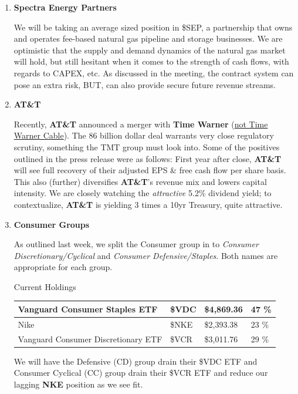 \documentclass[11pt,pressrelease]{newlfm} %
\begin{document}
\begin{newlfm}


\vspace{-.25 in} 			%
\begin{singlespace} 		%

\begin{enumerate}
\item \textbf{Spectra Energy Partners} \par
We will be taking an average sized position in \$SEP, a partnership that owns and operates fee-based natural gas pipeline and storage businesses. We are optimistic that the supply and demand dynamics of the natural gas market will hold, but still hesitant when it comes to the strength of cash flows, with regards to CAPEX, etc. As discussed in the meeting, the contract system can pose an extra risk, BUT, can also provide secure future revenue streams.

\item \textbf{AT\&T} \par
Recently, \textbf{AT\&T} announced a merger with \textbf{Time Warner} (\href{http://www.wsj.com/articles/time-warner-makes-game-of-thrones-confused-customers-think-its-the-cable-company-1464790213}{not Time Warner Cable}). The 86 billion dollar deal warrants very close regulatory scrutiny, something the TMT group must look into. Some of the positives outlined in the press release were as follows: First year after close, \textbf{AT\&T} will see full recovery of their adjusted EPS \& free cash flow per share basis. This also (further) diversifies \textbf{AT\&T}’s revenue mix and lowers capital intensity. We are closely watching the \textit{attractive} 5.2\% dividend yield; to contextualize, \textbf{AT\&T} is yielding 3 times a 10yr Treasury, quite attractive. 

\item \textbf{Consumer Groups} \par
As outlined last week, we split the Consumer group in to \textit{Consumer Discretionary/Cyclical} and \textit{Consumer Defensive/Staples}. Both names are appropriate for each group. 

\begin{center}
Current Holdings \\
\begin{tabular}{|l|l|l|l|}
\hline
Vanguard Consumer Staples ETF &	\$VDC &	\$4,869.36 & 47 \%\\
\hline \hline
Nike &	\$NKE  & \$2,393.38 & 23 \% \\
\hline
Vanguard Consumer Discretionary ETF  & \$VCR & \$3,011.76 & 29 \% \\
\hline
\end{tabular}
\end{center}
We will have the Defensive (CD) group drain their \$VDC ETF and Consumer Cyclical (CC) group drain their \$VCR ETF and reduce our lagging \textbf{NKE} position as we see fit. 


\end{enumerate}
\end{singlespace}
\end{newlfm}
\end{document}
